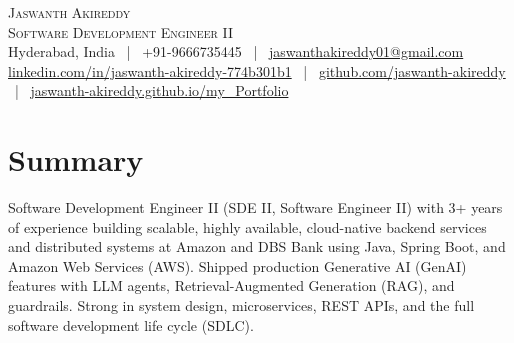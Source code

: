 \documentclass[letterpaper,10pt]{article}
\begin{document}
\begin{center}
    {\Huge \scshape Jaswanth Akireddy} \\ \vspace{3pt}
    {\scshape Software Development Engineer II} \\ \vspace{3pt}
    \small
    Hyderabad, India ~|~ +91-9666735445 ~|~
    \href{mailto:jaswanthakireddy01@gmail.com}{jaswanthakireddy01@gmail.com} \\ \vspace{1pt}
    \href{https://www.linkedin.com/in/jaswanth-akireddy-774b301b1/}{linkedin.com/in/jaswanth-akireddy-774b301b1} ~|~
    \href{https://github.com/jaswanth-akireddy}{github.com/jaswanth-akireddy} ~|~
    \href{https://jaswanth-akireddy.github.io/my_Portfolio/}{jaswanth-akireddy.github.io/my\_Portfolio}
    \vspace{-7pt}
\end{center}

\section{Summary}
\vspace{1pt}
{\small Software Development Engineer II (SDE II, Software Engineer II) with 3+ years of experience building scalable, highly available, cloud-native backend services and distributed systems at Amazon and DBS Bank using Java, Spring Boot, and Amazon Web Services (AWS). Shipped production Generative AI (GenAI) features with LLM agents, Retrieval-Augmented Generation (RAG), and guardrails. Strong in system design, microservices, REST APIs, and the full software development life cycle (SDLC).\par}
\vspace{-5pt}

\end{document}

